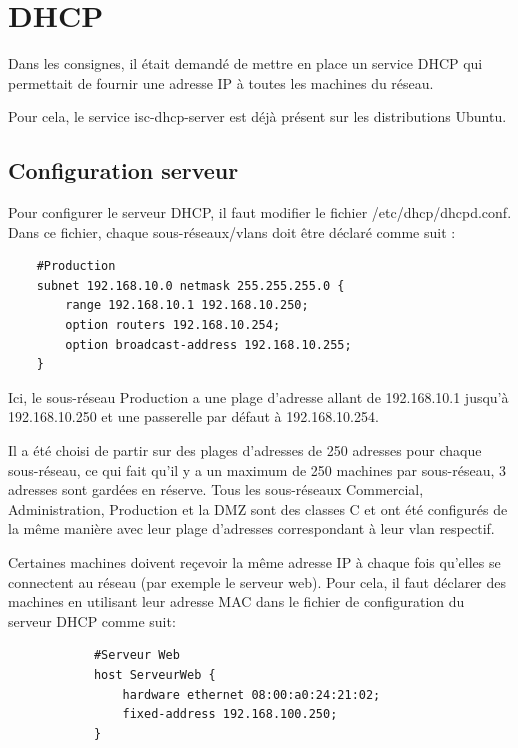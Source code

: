 \documentclass[a4paper,12pt]{report}
\begin{document}
        \section{DHCP}
            Dans les consignes, il était demandé de mettre en place un service DHCP qui permettait de fournir une adresse IP à toutes les machines du réseau. 
            
            Pour cela, le service isc-dhcp-server est déjà présent sur les distributions Ubuntu.
            \subsection{Configuration serveur}
            Pour configurer le serveur DHCP, il faut modifier le fichier /etc/dhcp/dhcpd.conf. 
            Dans ce fichier, chaque sous-réseaux/vlans doit être déclaré comme suit :
                

    \begin{verbatim}
    #Production
    subnet 192.168.10.0 netmask 255.255.255.0 {
        range 192.168.10.1 192.168.10.250;
        option routers 192.168.10.254;
        option broadcast-address 192.168.10.255;
    }
    \end{verbatim}

                
            Ici, le sous-réseau Production a une plage d'adresse allant de 192.168.10.1 jusqu'à 192.168.10.250 et une passerelle par défaut à 192.168.10.254.

            Il a été choisi de partir sur des plages d'adresses de 250 adresses pour chaque sous-réseau, ce qui fait qu'il y a un maximum de 250 machines par sous-réseau, 3 adresses sont gardées en réserve.
            Tous les sous-réseaux Commercial, Administration, Production et la DMZ sont des classes C et ont été configurés de la même manière avec leur plage d'adresses correspondant à leur vlan respectif.

            Certaines machines doivent reçevoir la même adresse IP à chaque fois qu'elles se connectent au réseau (par exemple le serveur web).
            Pour cela, il faut déclarer des machines en utilisant leur adresse MAC dans le fichier de configuration du serveur DHCP comme suit:

            \begin{verbatim}
            #Serveur Web
            host ServeurWeb {
                hardware ethernet 08:00:a0:24:21:02;
                fixed-address 192.168.100.250;
            }
            \end{verbatim}
\end{document}
